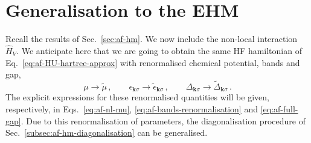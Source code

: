 \section{Generalisation to the EHM}\label{sec:af-ehm}

Recall the results of Sec.~\ref{sec:af-hm}. We now include the non-local interaction $\hat H_V$. We anticipate here that we are going to obtain the same HF hamiltonian of Eq.~\eqref{eq:af-HU-hartree-approx} with renormalised chemical potential, bands and  gap,
\[
\mu \to \tilde{\mu} \, ,
\qquad
\epsilon_{\mathbf{k}\sigma} \to \tilde{\epsilon}_{\mathbf{k}\sigma} \, ,
\qquad
\Delta_{\mathbf{k}\sigma} \to \tilde{\Delta}_{\mathbf{k}\sigma} \, .
\]
The explicit expressions for these renormalised quantities will be given, respectively, in Eqs.~\eqref{eq:af-nl-mu}, \eqref{eq:af-bands-renormalisation} and \eqref{eq:af-full-gap}. Due to this renormalisation of parameters, the diagonalisation procedure of Sec.~\ref{subsec:af-hm-diagonalisation} can be generalised.

